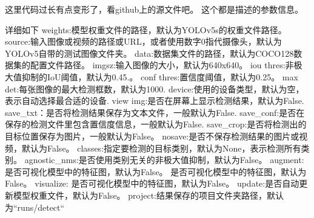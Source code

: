 这里代码过长有点变形了，看github上的源文件吧。
这个都是描述的参数信息。

详细如下
weights:模型权重文件的路径，默认为YOLOv5s的权重文件路径。
source:输入图像或视频的路径或URL，或者使用数字0指代摄像头，默认为YOLOv5自带的测试图像文件夹。
data:数据集文件的路径，默认为COCO128数据集的配置文件路径。
imgsz:输入图像的大小，默认为640x640。
iou thres:非极大值抑制的IoU阈值，默认为0.45.。
conf thres:置信度阈值，默认为0.25。
max det:每张图像的最大检测框数，默认为1000.
device:使用的设备类型，默认为空，表示自动选择最合适的设备.
view img:是否在屏幕上显示检测结果，默认为False.
save_txt：是否将检测结果保存为文本文件，一般默认为False.
save_conf:是否在保存的检测文件里包含置信度信息，一般默认为False.
save_crop:是否将检测出的目标位置保存为图片，一般默认为False。
nosave:是否不保存检测结果的图片或视频，默认为False。
classes:指定要检测的目标类别，默认为None，表示检测所有类别。
agnostic_nms:是否使用类别无关的非极大值抑制，默认为False。
augment:是否可视化模型中的特征图，默认为False。
是否可视化模型中的特征图，默认为False。
visualize:
是否可视化模型中的特征图，默认为False。
update:是否自动更新模型权重文件，默认为False。
project:结果保存的项目文件夹路径，默认为“runs/detect“
